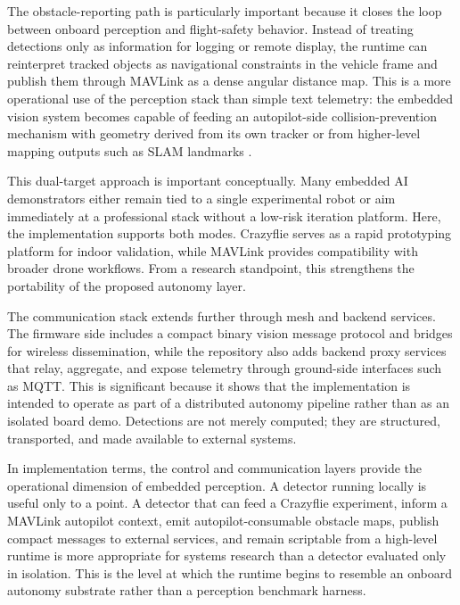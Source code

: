 The obstacle-reporting path is particularly important because it closes
the loop between onboard perception and flight-safety behavior. Instead
of treating detections only as information for logging or remote
display, the runtime can reinterpret tracked objects as navigational
constraints in the vehicle frame and publish them through MAVLink as a
dense angular distance map. This is a more operational use of the
perception stack than simple text telemetry: the embedded vision system
becomes capable of feeding an autopilot-side collision-prevention
mechanism with geometry derived from its own tracker or from
higher-level mapping outputs such as SLAM landmarks
\citep{DurrantWhyte2006, Cadena2016}.

This dual-target approach is important conceptually. Many embedded AI
demonstrators either remain tied to a single experimental robot or aim
immediately at a professional stack without a low-risk iteration
platform. Here, the implementation supports both modes. Crazyflie serves
as a rapid prototyping platform for indoor validation, while MAVLink
provides compatibility with broader drone workflows. From a research
standpoint, this strengthens the portability of the proposed autonomy
layer.

The communication stack extends further through mesh and backend
services. The firmware side includes a compact binary vision message
protocol and bridges for wireless dissemination, while the repository
also adds backend proxy services that relay, aggregate, and expose
telemetry through ground-side interfaces such as MQTT. This is
significant because it shows that the implementation is intended to
operate as part of a distributed autonomy pipeline rather than as an
isolated board demo. Detections are not merely computed; they are
structured, transported, and made available to external systems.

In implementation terms, the control and communication layers provide
the operational dimension of embedded perception. A detector running
locally is useful only to a point. A detector that can feed a Crazyflie
experiment, inform a MAVLink autopilot context, emit
autopilot-consumable obstacle maps, publish compact messages to external
services, and remain scriptable from a high-level runtime is more
appropriate for systems research than a detector evaluated only in
isolation. This is the level at which the runtime begins to resemble an
onboard autonomy substrate rather than a perception benchmark harness.
